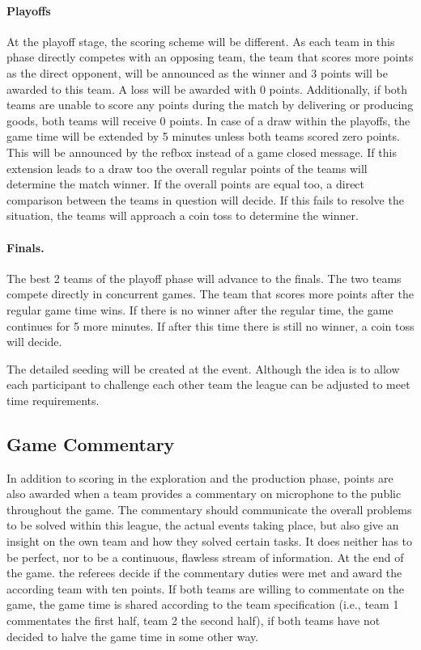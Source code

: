 \documentclass[12pt,twoside]{article}
\begin{document}
\paragraph{Playoffs}
At the playoff stage, the scoring scheme will be different. As each
team in this phase directly competes with an opposing team, the team
that scores more points as the direct opponent, will be announced as
the winner and 3 points will be awarded to this team. A loss will be
awarded with 0 points. Additionally, if both teams are unable to score
any points during the match by delivering or producing goods, both
teams will receive 0 points.
%
%
In case of a draw within the playoffs, the game time will be extended
by 5 minutes unless both teams scored zero points. This will be
announced by the refbox instead of a game closed message.
%
If this extension leads to a draw too the overall regular points of
the teams will determine the match winner. If the overall points are
equal too, a direct comparison between the teams in question will
decide. If this fails to resolve the situation, the teams will
approach a coin toss to determine the winner.



\paragraph{Finals.}
The best 2 teams of the playoff phase will advance to the finals.
The two teams compete directly in concurrent games. The team that
scores more points after the regular game time wins. If there is no
winner after the regular time, the game continues for 5 more
minutes. If after this time there is still no winner, a coin toss will
decide.

\bigskip
The detailed seeding will be created at the event. Although the idea
is to allow each participant to challenge each other team the league
can be adjusted to meet time requirements.


\subsection{Game Commentary}
In addition to scoring in the exploration and the production phase,
points are also awarded when a team provides a commentary on
microphone to the public throughout the game. The commentary should
communicate the overall problems to be solved within this league, the
actual events taking place, but also give an insight on the own team
and how they solved certain tasks. It does neither has to be perfect,
nor to be a continuous, flawless stream of information. At the end of
the game. the referees decide if the commentary duties were met and
award the according team with ten points. If both teams are willing to
commentate on the game, the game time is shared according to the team
specification (i.e., team 1 commentates the first half, team 2 the
second half), if both teams have not decided to halve the game time in
some other way.
\end{document}
